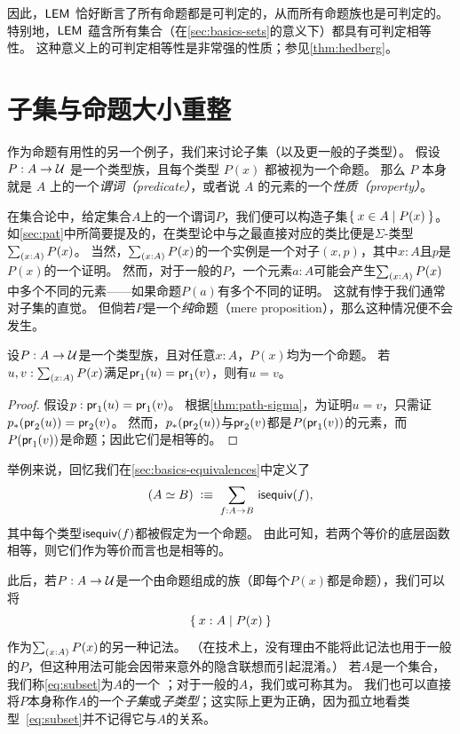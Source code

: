 因此，$\mathsf{LEM}_{}$ 恰好断言了所有命题都是可判定的，从而所有命题族也是可判定的。
特别地，$\mathsf{LEM}_{}$ 蕴含所有集合（在\cref{sec:basics-sets}的意义下）都具有可判定相等性。
这种意义上的可判定相等性是非常强的性质；参见\cref{thm:hedberg}。

%
%

\section{子集与命题大小重整}
\label{subsec:prop-subsets}

%

作为命题有用性的另一个例子，我们来讨论子集（以及更一般的子类型）。
假设 $P:A\to\mathcal{U}$ 是一个类型族，且每个类型 $P(x)$ 都被视为一个命题。
那么 $P$ 本身就是 $A$ 上的一个\emph{谓词（predicate）}，或者说 $A$ 的元素的一个\emph{性质（property）}。

在集合论中，给定集合$A$上的一个谓词$P$，我们便可以构造子集$\Set{x\in A | P(x)}$。
如\cref{sec:pat}中所简要提及的，在类型论中与之最直接对应的类比便是$\Sigma$-类型 $\sm{x:A} P(x)$。
当然，$\sm{x:A} P(x)$的一个实例是一个对子$(x,p)$，其中$x:A$且$p$是$P(x)$的一个证明。
然而，对于一般的$P$，一个元素$a:A$可能会产生$\sm{x:A} P(x)$中多个不同的元素——如果命题$P(a)$有多个不同的证明。
这就有悖于我们通常对子集的直觉。
但倘若$P$是一个\emph{纯}命题（mere proposition），那么这种情况便不会发生。

\begin{lem}\label{thm:path-subset}
  设$P:A\to\mathcal{U}$是一个类型族，且对任意$x:A$，$P(x)$均为一个命题。
  若$u,v:\sm{x:A} P(x)$满足$\mathsf{pr}_{1}(u) = \mathsf{pr}_{1}(v)$，则有$u=v$。
\end{lem}

\begin{proof}
  假设$p:\mathsf{pr}_{1}(u) = \mathsf{pr}_{1}(v)$。
  根据\cref{thm:path-sigma}，为证明$u=v$，只需证${p}_{*}\mathopen{}\left({\mathsf{pr}_{2}(u)}\right)\mathclose{} = \mathsf{pr}_{2}(v)$。
  然而，${p}_{*}\mathopen{}\left({\mathsf{pr}_{2}(u)}\right)\mathclose{}$与$\mathsf{pr}_{2}(v)$都是$P(\mathsf{pr}_{1}(v))$的元素，而$P(\mathsf{pr}_{1}(v))$是命题；因此它们是相等的。
\end{proof}

举例来说，回忆我们在\cref{sec:basics-equivalences}中定义了
\[(\eqv A B) \;\defeq\; \sm{f:A\to B} \isequiv (f),\]
其中每个类型$\mathsf{isequiv} (f)$都被假定为一个命题。
由此可知，若两个等价的底层函数相等，则它们作为等价而言也是相等的。

\label{defn:setof}%
此后，若$P:A\to \mathcal{U}$是一个由命题组成的族（即每个$P(x)$都是命题），我们可以将
%
\begin{equation}
  \label{eq:subset}
  \Set{x:A | P(x)}
\end{equation}
%
作为$\sm{x:A} P(x)$的另一种记法。
（在技术上，没有理由不能将此记法也用于一般的$P$，但这种用法可能会因带来意外的隐含联想而引起混淆。）
若$A$是一个集合，我们称\eqref{eq:subset}为$A$的一个
%
%
；对于一般的$A$，我们或可称其为。
%
我们也可以直接将$P$本身称作$A$的一个\emph{子集}或\emph{子类型}；这实际上更为正确，因为孤立地看类型~\eqref{eq:subset}并不记得它与$A$的关系。

